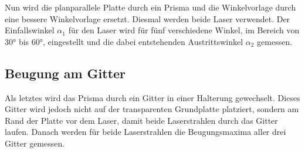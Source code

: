 \begin{flushleft}
    Nun wird die planparallele Platte durch ein Prisma und die Winkelvorlage durch eine bessere Winkelvorlage ersetzt.
    Diesmal werden beide Laser verwendet.
    Der Einfallswinkel $\alpha_{1}$ für den Laser wird für fünf verschiedene Winkel, im Bereich von $30\unit{\degree}$ bis $60\unit{\degree}$, eingestellt und die dabei entstehenden Austrittswinkel $\alpha_{2}$ gemessen.
\end{flushleft}

\subsection{Beugung am Gitter}

\begin{flushleft}
    Als letztes wird das Prisma durch ein Gitter in einer Halterung gewechselt.
    Dieses Gitter wird jedoch nicht auf der transparenten Grundplatte platziert, sondern am Rand der Platte vor dem Laser, damit beide Laserstrahlen durch das Gitter laufen.
    Danach werden für beide Laserstrahlen die Beugungsmaxima aller drei Gitter gemessen.
\end{flushleft}
